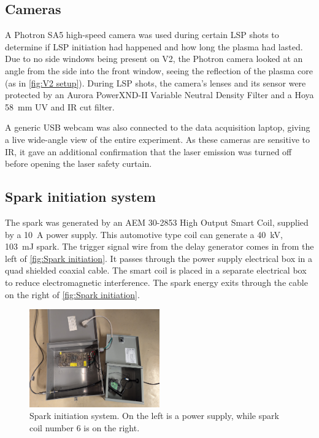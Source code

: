         \subsection{Cameras}

            A Photron SA5 high-speed camera was used during certain LSP shots to determine if LSP initiation had happened and how long the plasma had lasted. Due to no side windows being present on V2, the Photron camera looked at an angle from the side into the front window, seeing the reflection of the plasma core (as in \autoref{fig:V2 setup}). During LSP shots, the camera's lenses and its sensor were protected by an Aurora PowerXND-II Variable Neutral Density Filter and a Hoya \qty{58}{mm} UV and IR cut filter.

            A generic USB webcam was also connected to the data acquisition laptop, giving a live wide-angle view of the entire experiment. As these cameras are sensitive to IR, it gave an additional confirmation that the laser emission was turned off before opening the laser safety curtain.

        \subsection{Spark initiation system}

            The spark was generated by an AEM 30-2853 High Output Smart Coil, supplied by a \qty{10}{A} power supply. This automotive type coil can generate a \qty{40}{kV}, \qty{103}{mJ} spark. The trigger signal wire from the delay generator comes in from the left of \autoref{fig:Spark initiation}. It passes through the power supply electrical box in a quad shielded coaxial cable. The smart coil is placed in a separate electrical box to reduce electromagnetic interference. The spark energy exits through the cable on the right of \autoref{fig:Spark initiation}. 

            \begin{figure}[!ht]
                \centering
                \includegraphics[width=0.50\textwidth]{assets/3 design/Spark initiation system.jpg}
                \caption{Spark initiation system. On the left is a power supply, while spark coil number 6 is on the right.}
                \label{fig:Spark initiation}
            \end{figure}

